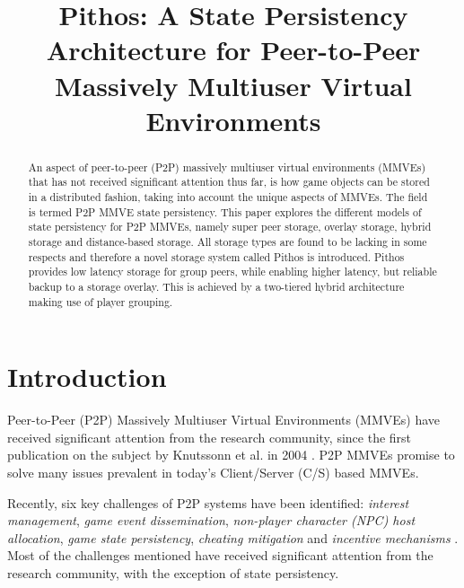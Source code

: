 \documentclass[10pt,a4paper,conference]{IEEEtran}
\begin{document}
%
\title{Pithos: A State Persistency Architecture for Peer-to-Peer Massively Multiuser Virtual Environments}


\maketitle

\begin{abstract}
An aspect of peer-to-peer (P2P) massively multiuser virtual environments (MMVEs) that has not received significant attention thus far, is how game
objects can be stored in a distributed fashion, taking into account the unique aspects of MMVEs. The field is termed P2P MMVE state persistency. This
paper explores the different models of state persistency for P2P MMVEs, namely super peer storage, overlay storage, hybrid storage and distance-based
storage. All storage types are found to be lacking in some respects and therefore a novel storage system called Pithos is introduced. Pithos provides
low latency storage for group peers, while enabling higher latency, but reliable backup to a storage overlay. This is achieved by a two-tiered hybrid
architecture making use of player grouping.
\end{abstract}


\section{Introduction}
\label{introduction}

Peer-to-Peer (P2P) Massively Multiuser Virtual Environments (MMVEs) have received significant attention from the research community, since the first
publication on the subject by Knutssonn et al. in 2004 \cite{knutsson_p2p_first}. P2P MMVEs promise to solve many issues prevalent in today's
Client/Server (C/S) based MMVEs.

Recently, six key challenges of P2P systems have been identified: \emph{interest management}, \emph{game event dissemination}, \emph{non-player
character (NPC) host allocation}, \emph{game state persistency}, \emph{cheating mitigation} and \emph{incentive mechanisms}
\cite{Fan_deisgn_issues_p2p}. Most of the challenges mentioned have received significant attention from the research community, with the exception of
state persistency.
\end{document}
